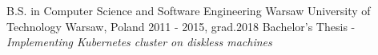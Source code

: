

\begin{cventries}

  \cventry
  {B.S. in Computer Science and Software Engineering} %
  {Warsaw University of Technology} %
  {Warsaw, Poland} %
  {2011 - 2015, grad.2018} %
  {
    Bachelor's Thesis - \em{Implementing Kubernetes cluster on diskless machines}
  }

\end{cventries}
